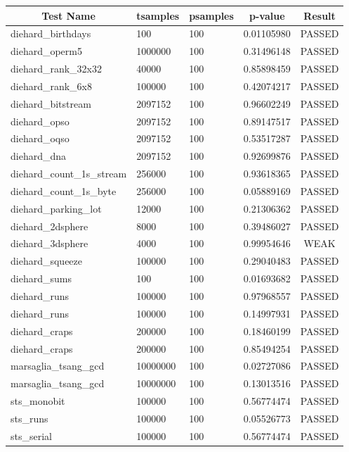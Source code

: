 \documentclass[titlepage, 11pt]{article}
\begin{document}
\begin{table}[!htb]
\begin{tabular}{l|l|l|c|c}
\hline
\multicolumn{1}{c|}{\textbf{Test Name}} & \multicolumn{1}{c|}{\textbf{tsamples}} & \multicolumn{1}{c|}{\textbf{psamples}} & \textbf{p-value} & \textbf{Result} \\ \hline
diehard\_birthdays & 100 & 100 & 0.01105980 & PASSED \\
diehard\_operm5 & 1000000 & 100 & 0.31496148 & PASSED \\
diehard\_rank\_32x32 & 40000 & 100 & 0.85898459 & PASSED \\
diehard\_rank\_6x8 & 100000 & 100 & 0.42074217 & PASSED \\
diehard\_bitstream & 2097152 & 100 & 0.96602249 & PASSED \\
diehard\_opso & 2097152 & 100 & 0.89147517 & PASSED \\
diehard\_oqso & 2097152 & 100 & 0.53517287 & PASSED \\
diehard\_dna & 2097152 & 100 & 0.92699876 & PASSED \\
diehard\_count\_1s\_stream & 256000 & 100 & 0.93618365 & PASSED \\
diehard\_count\_1s\_byte & 256000 & 100 & 0.05889169 & PASSED \\
diehard\_parking\_lot & 12000 & 100 & 0.21306362 & PASSED \\
diehard\_2dsphere & 8000 & 100 & 0.39486027 & PASSED \\
diehard\_3dsphere & 4000 & 100 & 0.99954646 & WEAK \\
diehard\_squeeze & 100000 & 100 & 0.29040483 & PASSED \\
diehard\_sums & 100 & 100 & 0.01693682 & PASSED \\
diehard\_runs & 100000 & 100 & 0.97968557 & PASSED \\
diehard\_runs & 100000 & 100 & 0.14997931 & PASSED \\
diehard\_craps & 200000 & 100 & 0.18460199 & PASSED \\
diehard\_craps & 200000 & 100 & 0.85494254 & PASSED \\
marsaglia\_tsang\_gcd & 10000000 & 100 & 0.02727086 & PASSED \\
marsaglia\_tsang\_gcd & 10000000 & 100 & 0.13013516 & PASSED \\
sts\_monobit & 100000 & 100 & 0.56774474 & PASSED \\
sts\_runs & 100000 & 100 & 0.05526773 & PASSED \\
sts\_serial & 100000 & 100 & 0.56774474 & PASSED \\

\end{tabular}
\end{table}
\end{document}
